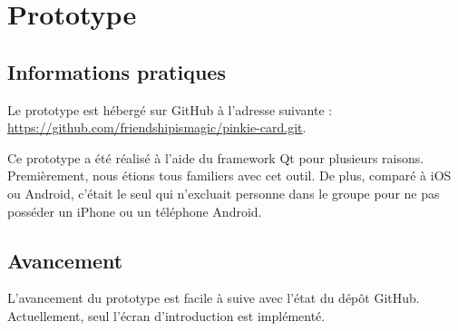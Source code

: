 \documentclass[a4paper,12pt]{article}
\begin{document}
\section{Prototype}

\subsection{Informations pratiques}

Le prototype est hébergé sur GitHub à l'adresse suivante : \\
\url{https://github.com/friendshipismagic/pinkie-card.git}.

Ce prototype a été réalisé à l'aide du framework Qt pour plusieurs raisons. Premièrement, nous étions tous familiers
avec cet outil. De plus, comparé à iOS ou Android, c'était le seul qui n'excluait personne dans le groupe pour ne pas
posséder un iPhone ou un téléphone Android.

\subsection{Avancement}

L'avancement du prototype est facile à suive avec l'état du dépôt GitHub. Actuellement, seul l'écran d'introduction
est implémenté.
\end{document}
